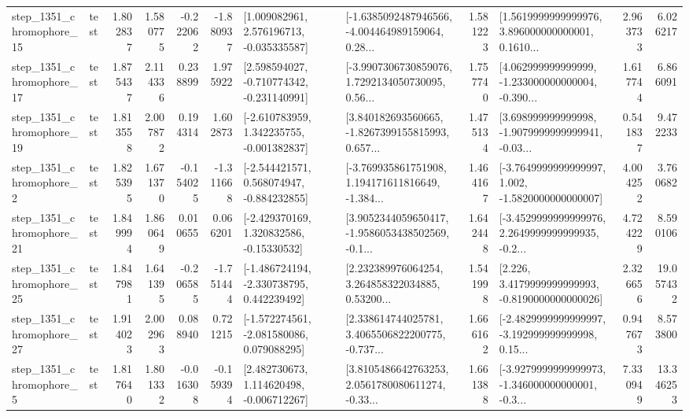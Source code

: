 \begin{tabular}{llrrrrllrlrr}
 step\_1351\_chromophore\_15 &      test &      1.802837 &    1.580775 &     -0.222062 & -1.880937 &    [1.009082961, 2.576196713, -0.035335587] &  [-1.6385092487946566, -4.004464989159064, 0.28... &       1.581223 &  [1.5619999999999976, 3.896000000000001, 0.1610... &            2.963733 &          6.026217 \\
 step\_1351\_chromophore\_17 &      test &      1.875437 &    2.114336 &      0.238899 &  1.975922 &   [2.598594027, -0.710774342, -0.231140991] &  [-3.9907306730859076, 1.7292134050730095, 0.56... &       1.757740 &  [4.062999999999999, -1.233000000000004, -0.390... &            1.617744 &          6.866091 \\
 step\_1351\_chromophore\_19 &      test &      1.813558 &    2.007872 &      0.194314 &  1.602873 &   [-2.610783959, 1.342235755, -0.001382837] &  [3.840182693560665, -1.8267399155815993, 0.657... &       1.475134 &  [3.698999999999998, -1.9079999999999941, -0.03... &            0.541837 &          9.472233 \\
  step\_1351\_chromophore\_2 &      test &      1.825395 &    1.671370 &     -0.154025 & -1.311668 &   [-2.544421571, 0.568074947, -0.884232855] &  [-3.769935861751908, 1.194171611816649, -1.384... &       1.464167 &  [-3.7649999999999997, 1.002, -1.5820000000000007] &            4.004252 &          3.760682 \\
 step\_1351\_chromophore\_21 &      test &      1.849994 &    1.860649 &      0.010655 &  0.066201 &    [-2.429370169, 1.320832586, -0.15330532] &  [3.9052344059650417, -1.9586053438502569, -0.1... &       1.642448 &  [-3.4529999999999976, 2.2649999999999935, -0.2... &            4.724229 &          8.590106 \\
 step\_1351\_chromophore\_25 &      test &      1.847981 &    1.641395 &     -0.206585 & -1.751444 &   [-1.486724194, -2.330738795, 0.442239492] &  [2.232389976064254, 3.264858322034885, 0.53200... &       1.541998 &   [2.226, 3.4179999999999993, -0.8190000000000026] &            2.326656 &         19.057432 \\
 step\_1351\_chromophore\_27 &      test &      1.914023 &    2.002963 &      0.088940 &  0.721215 &   [-1.572274561, -2.081580086, 0.079088295] &  [2.338614744025781, 3.4065506822200775, -0.737... &       1.666162 &  [-2.4829999999999997, -3.192999999999998, 0.15... &            0.947673 &          8.573800 \\
  step\_1351\_chromophore\_5 &      test &      1.817640 &    1.801332 &     -0.016308 & -0.159394 &    [2.482730673, 1.114620498, -0.006712267] &  [3.8105486642763253, 2.0561780080611274, -0.33... &       1.661388 &  [-3.9279999999999973, -1.346000000000001, -0.3... &            7.330949 &         13.346253 \\

\end{tabular}
